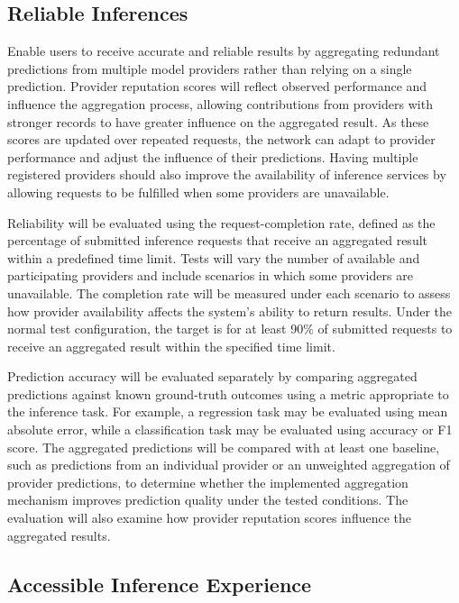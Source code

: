 \documentclass{article}
\begin{document}
\subsection{Reliable Inferences}

Enable users to receive accurate and reliable results by aggregating
redundant predictions from multiple model providers rather than
relying on a single prediction. Provider reputation scores will
reflect observed performance and influence the aggregation process,
allowing contributions from providers with stronger records to have
greater influence on the aggregated result. As these scores are
updated over repeated requests, the network can adapt to provider
performance and adjust the influence of their predictions.
Having multiple registered providers should also improve the
availability of inference services by allowing requests to be
fulfilled when some providers are unavailable.

Reliability will be evaluated using the request-completion rate,
defined as the percentage of submitted inference requests that receive
an aggregated result within a predefined time limit. Tests will vary
the number of available and participating providers and include
scenarios in which some providers are unavailable. The completion
rate will be measured under each scenario to assess how provider
availability affects the system's ability to return results. Under
the normal test configuration, the target is for at least 90\% of
submitted requests to receive an aggregated result within the
specified time limit.

Prediction accuracy will be evaluated separately by comparing
aggregated predictions against known ground-truth outcomes using a
metric appropriate to the inference task. For example, a regression
task may be evaluated using mean absolute error, while a
classification task may be evaluated using accuracy or F1 score.
The aggregated predictions will be compared with at least one
baseline, such as predictions from an individual provider or an
unweighted aggregation of provider predictions, to determine whether
the implemented aggregation mechanism improves prediction quality
under the tested conditions. The evaluation will also examine how
provider reputation scores influence the aggregated results.

\subsection{Accessible Inference Experience}
\end{document}
